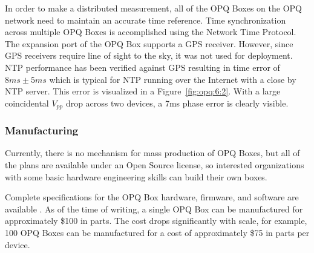 In order to make a distributed measurement, all of the OPQ Boxes on the OPQ network need to maintain an accurate time reference.
Time synchronization across multiple OPQ Boxes is accomplished using the Network Time Protocol.
The expansion port of the OPQ Box supports a GPS receiver.
However, since GPS receivers require line of sight to the sky, it was not used for deployment.
NTP performance has been verified against GPS resulting in time error of $8ms\pm 5ms$ which is typical for NTP running over the Internet with a close by NTP server.
This error is visualized in a Figure~\ref{fig:opq:6:2}.
With a large coincidental $V_{pp}$ drop across two devices, a 7ms phase error is clearly visible.

\subsubsection{Manufacturing}

Currently, there is no mechanism for mass production of OPQ Boxes, but all of the plans are available under an Open Source license, so interested organizations with some basic hardware engineering skills can build their own boxes.

Complete specifications for the OPQ Box hardware, firmware, and software are available \cite{negrashov_opq_2020}. As of the time of writing, a single OPQ Box can be manufactured for approximately \$100 in parts. The cost drops significantly with scale, for example, 100 OPQ Boxes can be manufactured for a cost of approximately \$75 in parts per device.






